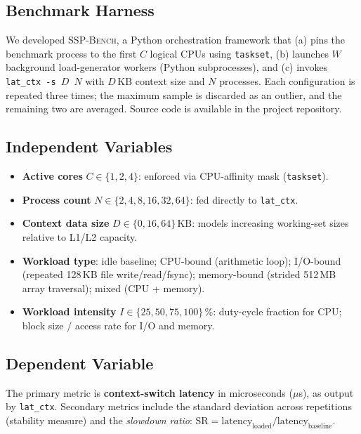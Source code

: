 \documentclass[conference]{IEEEtran}
\begin{document}
\subsection{Benchmark Harness}
We developed \textsc{SSP-Bench}, a Python orchestration framework that
(a) pins the benchmark process to the first $C$ logical CPUs using
\texttt{taskset}, (b) launches $W$ background load-generator workers
(Python subprocesses), and (c) invokes \texttt{lat\_ctx -s $D$ $N$} with
$D$\,KB context size and $N$ processes.  Each configuration is repeated three
times; the maximum sample is discarded as an outlier, and the remaining two
are averaged.  Source code is available in the project repository.

\subsection{Independent Variables}
\begin{itemize}
  \item \textbf{Active cores} $C \in \{1, 2, 4\}$: enforced via
        CPU-affinity mask (\texttt{taskset}).
  \item \textbf{Process count} $N \in \{2,4,8,16,32,64\}$: fed directly
        to \texttt{lat\_ctx}.
  \item \textbf{Context data size} $D \in \{0,16,64\}$\,KB: models
        increasing working-set sizes relative to L1/L2 capacity.
  \item \textbf{Workload type}: idle baseline; CPU-bound (arithmetic loop);
        I/O-bound (repeated 128\,KB file write/read/fsync); memory-bound (strided
        512\,MB array traversal); mixed (CPU + memory).
  \item \textbf{Workload intensity} $I \in \{25,50,75,100\}$\,\%: duty-cycle
        fraction for CPU; block size / access rate for I/O and memory.
\end{itemize}

\subsection{Dependent Variable}
The primary metric is \textbf{context-switch latency} in microseconds
($\mu$s), as output by \texttt{lat\_ctx}.  Secondary metrics include the
standard deviation across repetitions (stability measure) and the \emph{slowdown
ratio}: $\text{SR} = \text{latency}_\text{loaded} / \text{latency}_\text{baseline}$.

\end{document}
